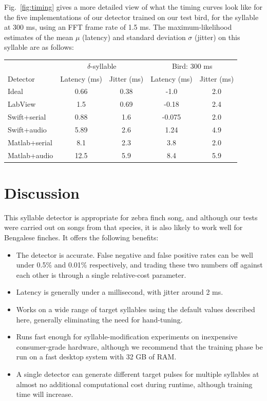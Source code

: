 \documentclass[10pt,letterpaper]{article}
\newcommand\fig[1]{Fig.~\ref{#1}}
\begin{document}
\fig{fig:timing} gives a more detailed view of what the timing curves look like for the five implementations of our detector trained on our test bird, for the syllable at 300 ms, using an FFT frame rate of 1.5 ms.  The maximum-likelihood estimates of the mean $\mu$ (latency) and standard deviation $\sigma$ (jitter) on this syllable are as follows:

\vspace{8pt}
\begin{tabular}{l|c|c|c| c}
  & \multicolumn{2}{c}{$\delta$-syllable} & \multicolumn{2}{c}{Bird: 300 ms} \\
  Detector & Latency (ms) & Jitter (ms) & Latency (ms) & Jitter (ms) \\
  \hline
  Ideal & 0.66 & 0.38 & -1.0 & 2.0 \\
  LabView & 1.5 & 0.69 & -0.18 & 2.4 \\
  Swift+serial & 0.88 & 1.6 & -0.075 & 2.0 \\
  Swift+audio & 5.89 & 2.6 & 1.24 & 4.9 \\
  Matlab+serial & 8.1 & 2.3 & 3.8 & 2.0 \\
  Matlab+audio & 12.5 & 5.9 & 8.4 & 5.9
\end{tabular}

\vspace{8pt}

\section{Discussion}
\label{sec:conclusion}

This syllable detector is appropriate for zebra finch song, and although our tests were carried out on songs from that species, it is also likely to work well for Bengalese finches.  It offers the following benefits:
\begin{itemize}
\item The detector is accurate. False negative and
  false positive rates can be well under 0.5\% and 0.01\% respectively, and trading these two numbers off against each other is through a single relative-cost parameter.
\item Latency is generally under a millisecond, with jitter around 2 ms.
\item Works on a wide range of target syllables using the default values described here, generally eliminating the need for hand-tuning.
\item Runs fast enough for syllable-modification experiments on inexpensive consumer-grade hardware, although we recommend that the training phase be run on a fast desktop system with 32 GB of RAM.
\item A single detector can generate different target pulses for multiple syllables at almost no additional computational cost during runtime, although training time will increase.
\end{itemize}
\end{document}
